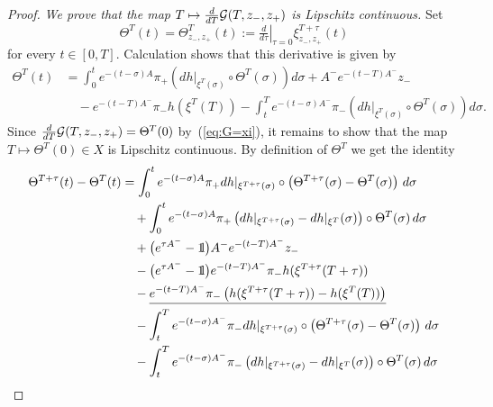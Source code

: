 \documentclass{article}
\begin{document}
\begin{proof}
{\it We prove that the map $T\mapsto\frac{d}{dT}{\mathcal{G}}(T,{z_-},z_+)$ is Lipschitz continuous.}
Set
\begin{equation}\label{eq:Theta-T}
     \Theta^T(t)=\Theta^T_{{z_-},z_+}(t)
     :=\left.\tfrac{d}{d\tau}\right|_{\tau=0}
     \xi^{T+\tau}_{{z_-},z_+}(t)
\end{equation}
for every $t\in[0,T]$. Calculation shows that this derivative is given by
\begin{equation*}
\begin{split}
     \Theta^T(t)
    &=\int_0^t e^{-(t-\sigma)A}\pi_+
     \left(dh|_{\xi^T(\sigma)}\circ \Theta^T(\sigma)\right)
     d\sigma
     +A^- e^{-(t-T)A^-}{z_-}
     \\
    &\quad
     -e^{-(t-T)A^-}\pi_- h(\xi^T(T))
     -\int_t^T e^{-(t-\sigma)A^-}\pi_-
     \left(dh|_{\xi^T(\sigma)}\circ \Theta^T(\sigma)\right)
     d\sigma.
\end{split}
\end{equation*}
Since $\frac{d}{dT}{\mathcal{G}}(T,{z_-},z_+)=\Theta^T(0)$
by~(\ref{eq:G=xi}), it remains to show that the map
$T\mapsto \Theta^T(0)\in X$ is Lipschitz continuous.
By definition of $\Theta^T$ we get the identity
\begin{equation*}
\begin{split}
     \Theta^{T+\tau}(t)-\Theta^T(t)
    &=\int_0^t e^{-(t-\sigma)A}\pi_+
     dh|_{\xi^{T+\tau}(\sigma)}\circ
     \left( \Theta^{T+\tau}(\sigma)-\Theta^T(\sigma)\right)
     \, d\sigma
  \\
    &\quad
     +\int_0^t e^{-(t-\sigma)A}\pi_+
     \left(
     dh|_{\xi^{T+\tau}(\sigma)}-dh|_{\xi^T}(\sigma)
     \right)\circ 
     \Theta^T(\sigma)
     \, d\sigma
   \\
    &\quad
     +\bigl(e^{\tau A^-}-\1\bigr)
     A^- e^{-(t-T)A^-}{z_-}
   \\
    &\quad
     -\bigl(e^{\tau A^-}-\1\bigr)
     e^{-(t-T)A^-}\pi_- h(\xi^{T+\tau}(T+\tau))
   \\
    &\quad
     -
\underline{
     e^{-(t-T)A^-}\pi_-
     \left(
     h(\xi^{T+\tau}(T+\tau))-h(\xi^T(T))
     \right)
}
   \\
    &\quad
     -\int_t^T e^{-(t-\sigma)A^-}\pi_-
     dh|_{\xi^{T+\tau}(\sigma)}\circ
     \left( \Theta^{T+\tau}(\sigma)-\Theta^T(\sigma)\right)
     \, d\sigma
  \\
    &\quad
     -\int_t^T e^{-(t-\sigma)A^-}\pi_-
     \left(
     dh|_{\xi^{T+\tau}(\sigma)}-dh|_{\xi^T}(\sigma)
     \right)\circ 
     \Theta^T(\sigma)
     \, d\sigma
   \\

\end{split}
\end{equation*}
\end{proof}
\end{document}
